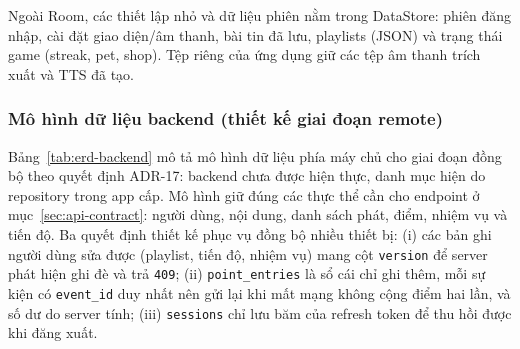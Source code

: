 Ngoài Room, các thiết lập nhỏ và dữ liệu phiên nằm trong DataStore: phiên đăng nhập, cài đặt giao diện/âm thanh, bài tin đã lưu, playlists (JSON) và trạng thái game (streak, pet, shop). Tệp riêng của ứng dụng giữ các tệp âm thanh trích xuất và TTS đã tạo.

\subsubsection{Mô hình dữ liệu backend (thiết kế giai đoạn remote)}
\label{sec:erd-backend}

Bảng~\ref{tab:erd-backend} mô tả mô hình dữ liệu phía máy chủ cho giai đoạn đồng bộ theo quyết định ADR-17: backend chưa được hiện thực, danh mục hiện do repository trong app cấp. Mô hình giữ đúng các thực thể cần cho endpoint ở mục~\ref{sec:api-contract}: người dùng, nội dung, danh sách phát, điểm, nhiệm vụ và tiến độ. Ba quyết định thiết kế phục vụ đồng bộ nhiều thiết bị: (i) các bản ghi người dùng sửa được (playlist, tiến độ, nhiệm vụ) mang cột \texttt{version} để server phát hiện ghi đè và trả \texttt{409}; (ii) \texttt{point\_entries} là sổ cái chỉ ghi thêm, mỗi sự kiện có \texttt{event\_id} duy nhất nên gửi lại khi mất mạng không cộng điểm hai lần, và số dư do server tính; (iii) \texttt{sessions} chỉ lưu băm của refresh token để thu hồi được khi đăng xuất.

